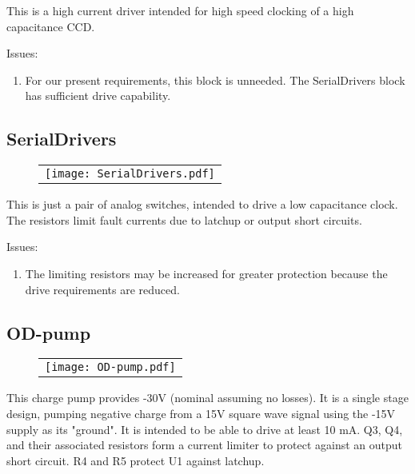 \documentclass[a4paper,12pt]{article}
\begin{document}
This is a high current driver intended for high speed clocking of a high capacitance CCD. 

Issues:
\begin{enumerate}
\item
For our present requirements, this block is unneeded. The SerialDrivers block has sufficient drive capability.
\end{enumerate}


\subsection{SerialDrivers}
   \begin{figure}
   \begin{center}
   \begin{tabular}{c}
   \texttt{[image: SerialDrivers.pdf]}
   \end{tabular}
   \end{center}
   \end{figure}
   
This is just a pair of analog switches, intended to drive a low capacitance clock. The resistors limit fault currents due to latchup or output short circuits.

Issues:
\begin{enumerate}
\item
The limiting resistors may be increased for greater protection because the drive requirements are reduced.
\end{enumerate}


\subsection{OD-pump}

   \begin{figure}
   \begin{center}
   \begin{tabular}{c}
   \texttt{[image: OD-pump.pdf]}
   \end{tabular}
   \end{center}
   \end{figure}
   
This charge pump provides -30V (nominal assuming no losses). It is a single stage design, pumping negative charge from a 15V square wave signal using the -15V supply as its "ground". It is intended to be able to drive at least 10 mA. Q3, Q4, and their associated resistors form a current limiter to protect against an output short circuit. R4 and R5 protect U1 against latchup.
\end{document}
